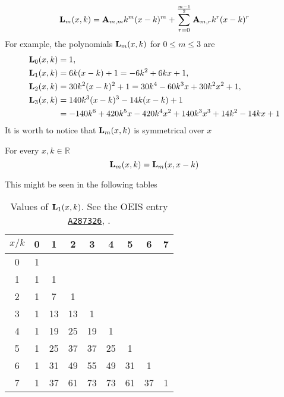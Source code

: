 \begin{equation*}
    {\mathbf{L}}\sb{m}(x,k) = {\mathbf{A}} \sb{m,m} k^m (x-k)^m + \sum_{r=0}^{\frac{m-1}{2}} {\mathbf{A}} \sb{m,r} k^r (x-k)^r
\end{equation*}
For example, the polynomials ${\mathbf{L}}\sb{m}(x,k)$ for $0\leq m\leq 3$ are
\begin{equation*}
    \begin{split}
        {\mathbf{L}}\sb{0}(x,k)
        &= 1, \\
        {\mathbf{L}}\sb{1}(x,k)
        &= 6 k (x-k) + 1
        = -6 k^2 + 6 k x + 1, \\
        {\mathbf{L}}\sb{2}(x,k)
        &=30 k^2 (x-k)^2+1
        =30 k^4-60 k^3 x+30 k^2 x^2+1, \\
        {\mathbf{L}}\sb{3}(x,k)
        &= 140 k^3 (x-k)^3-14 k (x-k)+1 \\
        &=-140 k^6+420 k^5 x-420 k^4 x^2+140 k^3 x^3+14 k^2-14 k x+1
    \end{split}
\end{equation*}
It is worth to notice that ${\mathbf{L}}\sb{m}(x,k)$ is symmetrical over $x$
\begin{ppty}
    \label{ppty_symmetry_of_polynomial_l}
    For every $x,k\in\mathbb{R}$
    \begin{equation*}
        {\mathbf{L}}\sb{m}(x,k) = {\mathbf{L}}\sb{m}(x,x-k)
    \end{equation*}
\end{ppty}
This might be seen in the following tables
\begin{table}[H]
    \setlength\extrarowheight{-6pt}
    \begin{tabular}{c|cccccccc}
        $x/k$ & 0 & 1  & 2  & 3  & 4  & 5  & 6  & 7 \\
        \hline
        0     & 1 &    &    &    &    &    &    &   \\
        1     & 1 & 1  &    &    &    &    &    &   \\
        2     & 1 & 7  & 1  &    &    &    &    &   \\
        3     & 1 & 13 & 13 & 1  &    &    &    &   \\
        4     & 1 & 19 & 25 & 19 & 1  &    &    &   \\
        5     & 1 & 25 & 37 & 37 & 25 & 1  &    &   \\
        6     & 1 & 31 & 49 & 55 & 49 & 31 & 1  &   \\
        7     & 1 & 37 & 61 & 73 & 73 & 61 & 37 & 1
    \end{tabular}
    ~\caption{Values of ${\mathbf{L}}\sb{1}(x,k)$.
    See the OEIS entry \href{https://oeis.org/A287326}{\texttt{A287326}}, \cite{kolosov2017third}.}
    \label{tab:fig_1}
\end{table}
